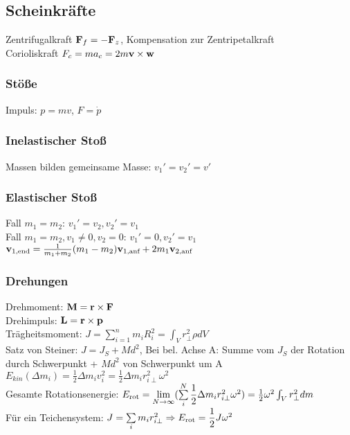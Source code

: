 \documentclass[fs, footer]{latex4ei}
\begin{document}
\begin{multicols*}{4}
\subsection{Scheinkräfte}%
Zentrifugalkraft $\textbf{F}_f = - \textbf{F}_z$, Kompensation zur Zentripetalkraft\\
Corioliskraft $F_c = ma_c = 2m\textbf{v} \times \textbf{w}$\\

\subsubsection{Stöße}
Impuls: $p = mv$, $F=\dot p$\\
\subsubsection{Inelastischer Stoß}
Massen bilden gemeinsame Masse: $v_1' = v_2' = v'$\\
\subsubsection{Elastischer Stoß}
Fall $m_1 = m_2$: $v_1' = v_2, v_2' = v_1$\\
Fall $m_1 = m_2, v_1 \neq 0, v_2 = 0$: $v_1' = 0, v_2' = v_1$\\
$\textbf{v}_{\text{1,end}} = \frac{1}{m_1+m_2}{(m_1-m_2)\textbf{v}_{\text{1,anf}} + 2m_1\textbf{v}_{\text{2,anf}}}$\\

\subsubsection{Drehungen}
Drehmoment: $\textbf{M} = \textbf{r} \times \textbf{F}$\\
Drehimpuls: $\textbf{L} = \textbf{r} \times \textbf{p}$\\
Trägheitsmoment: $J = \sum_{i=1}^n m_iR_i^2 = \int_V r_\perp^2\rho dV$\\
Satz von Steiner: $J = J_S + Md^2$, Bei bel. Achse A: Summe vom $J_S$ der Rotation durch Schwerpunkt + $Md^2$ von Schwerpunkt um A\\ %
$E_{kin}(\Delta m_i)=\frac{1}{2}\Delta m_iv_i^2=\frac{1}{2}\Delta m_ir_{i\perp}^2 \omega^2$\\
Gesamte Rotationsenergie: $E_{\text{rot}}=\lim_{N \rightarrow \infty} (\sum_i^N  \fr{1}{2}\Delta m_ir_{i\perp}^2 \omega^2)=\frac{1}{2} \omega ^2\int_Vr_\perp^2 dm$\\
Für ein Teichensystem: $J = \sum_{i}m_ir_{i\perp}^2 \Rightarrow E_{\text{rot}}=\fr{1}{2}J\omega^2$\\

\end{multicols*}
\end{document}
